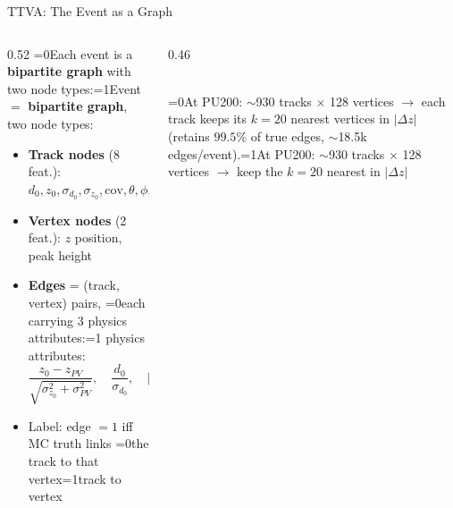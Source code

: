\documentclass[xcolor=table,aspectratio=169]{beamer}
\providecommand{\talkbuild}{0}
\newcommand{\readingonly}[1]{\ifnum\talkbuild=0\relax#1\fi}
\newcommand{\talkonly}[1]{\ifnum\talkbuild=1\relax#1\fi}
\begin{document}
\begin{frame}{TTVA: The Event as a Graph}
    \begin{columns}[c]
        \begin{column}{0.52\linewidth}
            \small
            \readingonly{Each event is a \textbf{bipartite graph} with two node types:}\talkonly{Event $=$ \textbf{bipartite graph}, two node types:}
            \begin{itemize}
                \setlength\itemsep{0.35em}
                \item \textcolor{mydarkblue}{\textbf{Track nodes}} (8 feat.): $d_0, z_0, \sigma_{d_0}, \sigma_{z_0}, \mathrm{cov}, \theta, \phi, p_T$
                \item \textcolor{myorange}{\textbf{Vertex nodes}} (2 feat.): $z$ position, peak height
                \item \textbf{Edges} = (track, vertex) pairs, \readingonly{each carrying 3 physics attributes:}\talkonly{3 physics attributes:}
                \[
                  \frac{z_0 - z_{PV}}{\sqrt{\sigma_{z_0}^2+\sigma_{PV}^2}},\quad
                  \frac{d_0}{\sigma_{d_0}},\quad |z_0 - z_{PV}|
                \]
                \item Label: edge $=1$ iff MC truth links \readingonly{the track to that vertex}\talkonly{track to vertex}
            \end{itemize}
        \end{column}
        \begin{column}{0.46\linewidth}
            \centering
            \\[6pt]
            {\scriptsize \readingonly{At PU200: $\sim$930 tracks $\times$ 128 vertices $\to$ each track keeps its
            $k{=}20$ nearest vertices in $|\Delta z|$ (retains $99.5\%$ of true edges, $\sim$18.5k edges/event).}\talkonly{At
            PU200: $\sim$930 tracks $\times$ 128 vertices $\to$ keep the $k{=}20$ nearest in $|\Delta z|$}}
        \end{column}
    \end{columns}
\end{frame}
\end{document}
